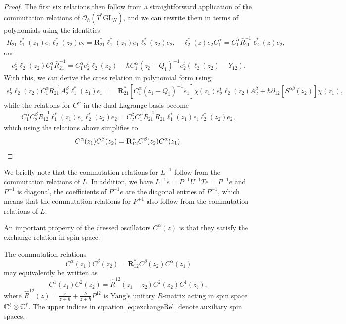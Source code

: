 \begin{proof}
The first six relations then follow from a straightforward application of the commutation relations of $\mathcal{O}_\hbar(T^* \mathrm{GL}_N)$, and we can rewrite them in terms of polynomials using the identities
\begin{align*}
R_{21} \ell_1^*(z_1) e_1 \ell_2^*(z_2) e_2 = \mathbf{R}_{21}^* \ell_1^*(z_1) e_1 \ell_2^*(z_2) e_2, \quad \ell_2^*(z) e_2 C_1^\alpha = C_1^\alpha \bar R_{21}^{-1} \ell_2^*(z) e_2,
\end{align*}
and
\begin{align*}
e_2^t \ell_2(z_2) C_1^\alpha \bar R_{21}^{-1} = C_1^\alpha e_2^t \ell_2(z_2) - \hbar C_1^\alpha (z_2-Q_1)^{-1} e_2^t (\ell_2(z_2) - Y_{12}).
\end{align*}
With this, we can derive the cross relation in polynomial form using:
\begin{align*}
e_2^t \ell_2(z_2) C_1^\alpha \bar R_{21}^{-1} A_2^\beta \ell_1^*(z_1) e_1
={}& \mathbf{R}_{21}^*[C_1^\alpha (z_1-Q_1)^{-1} e_1] \chi(z_1) e_2^t \ell_2(z_2) A_2^\beta + \hbar \partial_{12}[S^{\alpha\beta}(z_2)] \chi(z_1),
\end{align*}
while the relations for $C^\alpha$ in the dual Lagrange basis become
\begin{align*}
C_1^\alpha C_2^\beta \bar R_{12}^{-1} \ell_1^*(z_1) e_1 \ell_2^*(z_2) e_2 = C_2^\beta C_1^\alpha \bar R_{21}^{-1} R_{21} \ell_1^*(z_1) e_1 \ell_2^*(z_2) e_2,
\end{align*}
which using the relations above simplifies to
\begin{equation*}
C^\alpha(z_1) C^\beta(z_2) = \mathbf{R}_{12}^* C^\beta(z_2) C^\alpha(z_1). \qedhere
\end{equation*}
\end{proof}

\begin{remark}
We briefly note that the commutation relations for $L^{-1}$ follow from the commutation relations of $L$. In addition, we have $L^{-1}e = P^{-1} U^{-1} Te = P^{-1}e$ and $P^{-1}$ is diagonal, the coefficients of $P^{-1} e$ are the diagonal entries of $P^{-1}$, which means that the commutation relations for $P^{\pm 1}$ also follow from the commutation relations of $L$.
\end{remark}

An important property of the dressed oscillators $C^\alpha(z)$ is that they satisfy the exchange relation in spin space:

\begin{prop}
The commutation relations
\begin{equation}
C^\alpha(z_1) C^\beta(z_2) = \mathbf{R}_{12}^* C^\beta(z_2) C^\alpha(z_1)    
\end{equation}
may equivalently be written as
\begin{equation}\label{eq:exchangeRel}
C^1(z_1) C^2(z_2) = \hat R^{12}(z_1-z_2) C^2(z_2) C^1(z_1),
\end{equation}
where $\hat R^{12}(z) = \frac{z}{z+\hbar} + \frac{\hbar}{z+\hbar} P^{12}$ is Yang's unitary $R$-matrix acting in spin space $\mathbb{C}^\ell \otimes \mathbb{C}^\ell$. The upper indices in equation \eqref{eq:exchangeRel} denote auxiliary spin spaces.
\end{prop}

